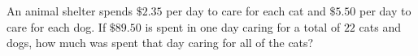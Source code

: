 An animal shelter spends $\$2.35$ per day to care for each cat and $\$5.50$ per day to care for each dog. If $\$89.50$ is spent in one day caring for a total of $22$ cats and dogs, how much was spent that day caring for all of the cats?
